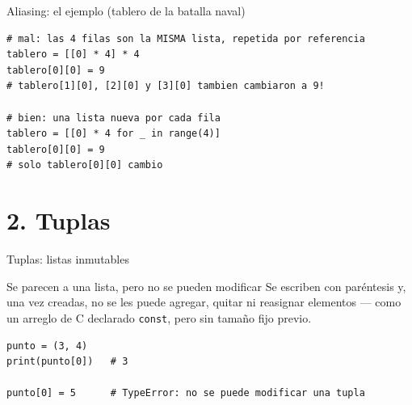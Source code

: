 \documentclass{beamer}
\begin{document}
\begin{frame}[fragile]{Aliasing: el ejemplo (tablero de la batalla naval)}
  \begin{verbatim}
# mal: las 4 filas son la MISMA lista, repetida por referencia
tablero = [[0] * 4] * 4
tablero[0][0] = 9
# tablero[1][0], [2][0] y [3][0] tambien cambiaron a 9!

# bien: una lista nueva por cada fila
tablero = [[0] * 4 for _ in range(4)]
tablero[0][0] = 9
# solo tablero[0][0] cambio
  \end{verbatim}
\end{frame}

\section{2. Tuplas}

\begin{frame}[fragile]{Tuplas: listas inmutables}
  \begin{block}{Se parecen a una lista, pero no se pueden modificar}
    Se escriben con paréntesis y, una vez creadas, no se les puede
    agregar, quitar ni reasignar elementos — como un arreglo de C
    declarado \texttt{const}, pero sin tamaño fijo previo.
  \end{block}
  \begin{verbatim}
punto = (3, 4)
print(punto[0])   # 3

punto[0] = 5      # TypeError: no se puede modificar una tupla
  \end{verbatim}
\end{frame}
\end{document}

